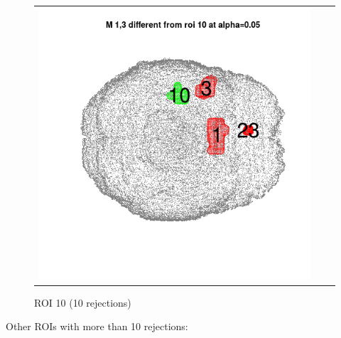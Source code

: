 \documentclass[12pt]{article}
\begin{document}
\begin{figure}[h]
\begin{tabular}{ccc}
\includegraphics[scale = 0.24]{../a7plots/d_3r_10_view3.png} \\ 
\end{tabular}
\caption{ROI 10 (10 rejections)}
\end{figure}

Other ROIs with more than 10 rejections:
\end{document}
